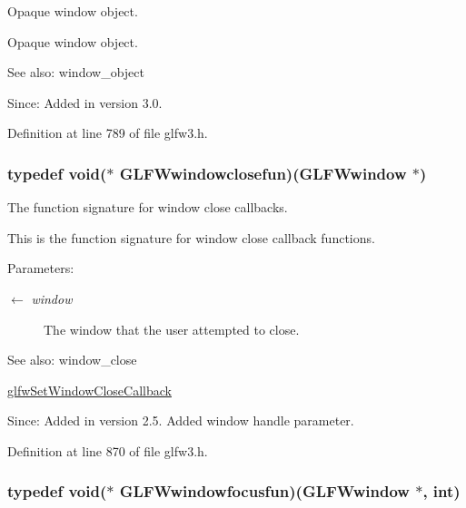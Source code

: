 Opaque window object. 

Opaque window object.

\begin{Desc}
\item[See also:]window\_\-object\end{Desc}
\begin{Desc}
\item[Since:]Added in version 3.0. \end{Desc}


Definition at line 789 of file glfw3.h.\hypertarget{group__window_g07cff8bd3b3d573ecf49bb02d7669c1f}{
\subsubsection[GLFWwindowclosefun]{\setlength{\rightskip}{0pt plus 5cm}typedef void($\ast$  {\bf GLFWwindowclosefun})({\bf GLFWwindow} $\ast$)}}
\label{group__window_g07cff8bd3b3d573ecf49bb02d7669c1f}


The function signature for window close callbacks. 

This is the function signature for window close callback functions.

\begin{Desc}
\item[Parameters:]
\begin{description}
\item[\mbox{$\leftarrow$} {\em window}]The window that the user attempted to close.\end{description}
\end{Desc}
\begin{Desc}
\item[See also:]window\_\-close 

\hyperlink{group__window_g5b827da350141c789acd64f5c4f7a0e1}{glfwSetWindowCloseCallback}\end{Desc}
\begin{Desc}
\item[Since:]Added in version 2.5.  Added window handle parameter. \end{Desc}


Definition at line 870 of file glfw3.h.\hypertarget{group__window_g6b5f973531ea91663ad707ba4f2ac104}{
\subsubsection[GLFWwindowfocusfun]{\setlength{\rightskip}{0pt plus 5cm}typedef void($\ast$  {\bf GLFWwindowfocusfun})({\bf GLFWwindow} $\ast$, int)}}
\label{group__window_g6b5f973531ea91663ad707ba4f2ac104}


